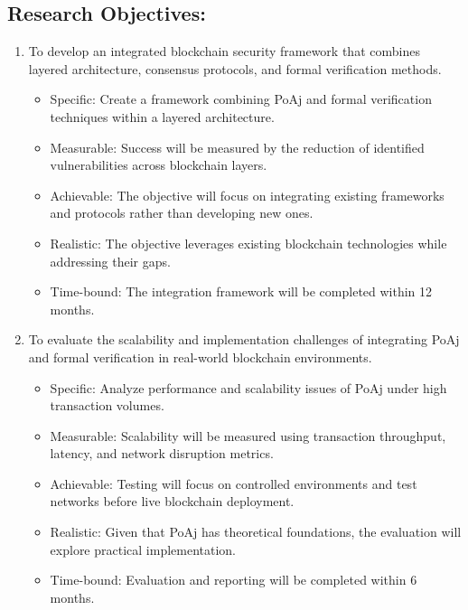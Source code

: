\documentclass[a4paper, 12pt]{article}
\begin{document}
\subsection{Research Objectives:}
\begin{enumerate}
    \item To develop an integrated blockchain security framework that combines layered architecture, consensus protocols, and formal verification methods.
    \begin{itemize}
    \item Specific: Create a framework combining PoAj and formal verification techniques within a layered architecture.
    \item Measurable: Success will be measured by the reduction of identified vulnerabilities across blockchain layers.
    \item Achievable: The objective will focus on integrating existing frameworks and protocols rather than developing new ones.
    \item Realistic: The objective leverages existing blockchain technologies while addressing their gaps.
    \item Time-bound: The integration framework will be completed within 12 months.
\end{itemize}

     \item To evaluate the scalability and implementation challenges of integrating PoAj and formal verification in real-world blockchain environments.
     \begin{itemize}
    \item Specific: Analyze performance and scalability issues of PoAj under high transaction volumes.
    \item Measurable: Scalability will be measured using transaction throughput, latency, and network disruption metrics.
    \item Achievable: Testing will focus on controlled environments and test networks before live blockchain deployment.
    \item Realistic: Given that PoAj has theoretical foundations, the evaluation will explore practical implementation.
    \item Time-bound: Evaluation and reporting will be completed within 6 months.
\end{itemize}


\end{enumerate}
\end{document}
